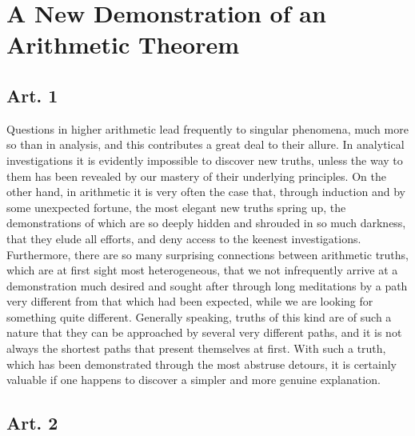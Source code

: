 \documentclass{book}
\theoremstyle{plain}
\theoremstyle{remark}
\begin{document}
\section*{ A New Demonstration of an Arithmetic Theorem } 

\subsection*{Art. 1}

Questions in higher arithmetic lead frequently to singular phenomena, much more so than in analysis, and this contributes a great deal to their allure.  In analytical investigations it is evidently impossible to discover new truths, unless the way to them has been revealed by our mastery of their underlying principles.  On the other hand, in arithmetic it is very often the case that, through induction and by some unexpected fortune, the most elegant new truths spring up, the demonstrations of which are so deeply hidden and shrouded in so much darkness, that they elude all efforts, and deny access to the keenest investigations.   Furthermore, there are so many surprising connections between arithmetic truths, which are at first sight most heterogeneous, that we not infrequently arrive at a demonstration much desired and sought after through long meditations by a path very different from that which had been expected, while we are looking for something quite different.  Generally speaking, truths of this kind are of such a nature that they can be approached by several very different paths, and it is not always the shortest paths that present themselves at first.   With such a truth, which has been demonstrated through the most abstruse detours, it is certainly valuable if one happens to discover a simpler and more genuine explanation.

\subsection*{Art. 2}
\end{document}
